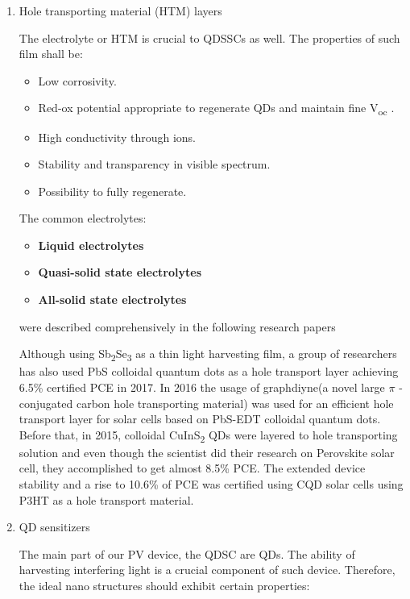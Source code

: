 \begin{enumerate}
\item Hole transporting material (HTM) layers

The electrolyte or HTM is crucial to QDSSCs as well. The properties of
such film shall be:

\begin{itemize}
\item
  Low corrosivity.
\item
  Red-ox potential appropriate to regenerate QDs and maintain fine
  V\textsubscript{oc} .
\item
  High conductivity through ions.
\item
  Stability and transparency in visible spectrum.
\item
  Possibility to fully regenerate. \cite{HuashangRao2018}
\end{itemize}

The common electrolytes:

\begin{itemize}
\item
  \textbf{Liquid electrolytes}
\item
  \textbf{Quasi-solid state electrolytes}
\item
  \textbf{All-solid state electrolytes}
\end{itemize}

were described comprehensively in the following research papers \cite{HuashangRao2018} \cite{Zhang2015} \cite{Song2017}

Although using Sb\textsubscript{2}Se\textsubscript{3} as a thin light
harvesting film, a group of researchers has also used PbS colloidal
quantum dots as a hole transport layer achieving 6.5\% certified PCE in
2017. \cite{Wang2017} In 2016 the usage of graphdiyne(a novel large $\pi$ -conjugated carbon hole transporting material) was used for an efficient hole transport layer for solar cells based on PbS-EDT colloidal quantum dots.\cite{MingjianYuan2016} Before that, in 2015, colloidal CuInS\textsubscript{2} QDs were layered to hole transporting solution and even though the scientist did their research on Perovskite solar cell, they accomplished to get almost 8.5\% PCE.\cite{JunZhu2015} The extended device stability and a rise to 10.6\% of PCE was certified using CQD solar cells using P3HT as a hole transport material. \cite{Zhang2016}


\item QD sensitizers 

The main part of our PV device, the QDSC are QDs. The ability of harvesting interfering light is a crucial component of such device. \cite{Ikeda2014} Therefore, the ideal nano structures should exhibit certain properties:


\end{enumerate}
